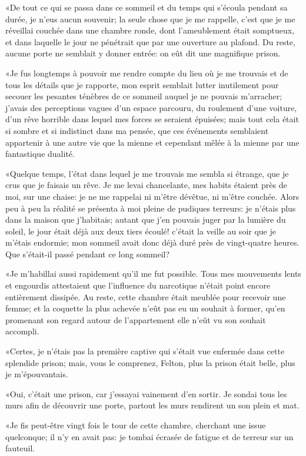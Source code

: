 «De tout ce qui se passa dans ce sommeil et du temps qui s'écoula pendant sa durée, je n'eus aucun souvenir; la seule chose que je me rappelle, c'est que je me réveillai couchée dans une chambre ronde, dont l'ameublement était somptueux, et dans laquelle le jour ne pénétrait que par une ouverture au plafond. Du reste, aucune porte ne semblait y donner entrée: on eût dit une magnifique prison. 

«Je fus longtemps à pouvoir me rendre compte du lieu où je me trouvais et de tous les détails que je rapporte, mon esprit semblait lutter inutilement pour secouer les pesantes ténèbres de ce sommeil auquel je ne pouvais m'arracher; j'avais des perceptions vagues d'un espace parcouru, du roulement d'une voiture, d'un rêve horrible dans lequel mes forces se seraient épuisées; mais tout cela était si sombre et si indistinct dans ma pensée, que ces événements semblaient appartenir à une autre vie que la mienne et cependant mêlée à la mienne par une fantastique dualité. 

«Quelque temps, l'état dans lequel je me trouvais me sembla si étrange, que je crus que je faisais un rêve. Je me levai chancelante, mes habits étaient près de moi, sur une chaise: je ne me rappelai ni m'être dévêtue, ni m'être couchée. Alors peu à peu la réalité se présenta à moi pleine de pudiques terreurs: je n'étais plus dans la maison que j'habitais; autant que j'en pouvais juger par la lumière du soleil, le jour était déjà aux deux tiers écoulé! c'était la veille au soir que je m'étais endormie; mon sommeil avait donc déjà duré près de vingt-quatre heures. Que s'était-il passé pendant ce long sommeil? 

«Je m'habillai aussi rapidement qu'il me fut possible. Tous mes mouvements lents et engourdis attestaient que l'influence du narcotique n'était point encore entièrement dissipée. Au reste, cette chambre était meublée pour recevoir une femme; et la coquette la plus achevée n'eût pas eu un souhait à former, qu'en promenant son regard autour de l'appartement elle n'eût vu son souhait accompli. 

«Certes, je n'étais pas la première captive qui s'était vue enfermée dans cette splendide prison; mais, vous le comprenez, Felton, plus la prison était belle, plus je m'épouvantais. 

«Oui, c'était une prison, car j'essayai vainement d'en sortir. Je sondai tous les murs afin de découvrir une porte, partout les murs rendirent un son plein et mat. 

«Je fis peut-être vingt fois le tour de cette chambre, cherchant une issue quelconque; il n'y en avait pas: je tombai écrasée de fatigue et de terreur sur un fauteuil. 

